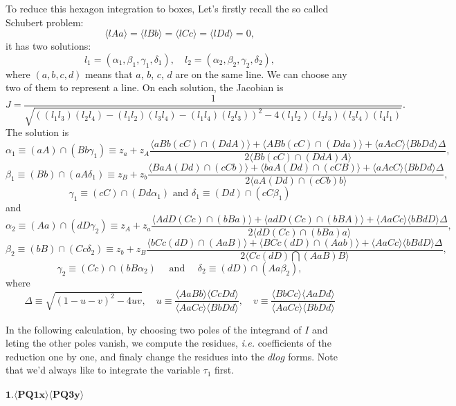\documentclass[10pt]{article}
\def\<{\langle}
\def\>{\rangle}
\begin{document}
To reduce this hexagon integration to boxes, Let's firstly recall the so called Schubert problem: 
\[
    \langle lAa\rangle = \langle lBb\rangle = \langle lCc\rangle = \langle lDd\rangle=0,
\]
it has two solutions:
\[
    l_1 = (\alpha_1,\beta_1,\gamma_1,\delta_1),\quad l_2 = (\alpha_2,\beta_2,\gamma_2,\delta_2),
\]
where $(a,b,c,d)$ means that $a$, $b$, $c$, $d$ are on the same line. We can choose any two of them to represent a line. On each solution, the Jacobian is 
\[
    J=\frac{1}{\sqrt{((l_1l_3)(l_2l_4)-(l_1l_2)(l_3l_4)-(l_1l_4)(l_2l_3))^2-4(l_1l_2)(l_2l_3)(l_3l_4)(l_4l_1)}}.
\]
The solution is
\[
    \alpha_{1} \equiv(a A) \cap\left(B b \gamma_{1}\right) \equiv z_{a}+z_{A} \frac{\langle a B b(c C) \cap(D d A)\rangle+\langle A B b(c C) \cap(D d a)\rangle+\langle a A c C\rangle\langle B b D d\rangle \Delta}{2\langle B b(c C) \cap(D d A) A\rangle},
\]
\[
    \beta_{1} \equiv(B b) \cap\left(a A \delta_{1}\right) \equiv z_{B}+z_{b} \frac{\langle B a A(D d) \cap(c C b)\rangle+\langle b a A(D d) \cap(c C B)\rangle+\langle a A c C\rangle\langle B b D d\rangle \Delta}{2\langle a A(D d) \cap(c C b) b\rangle},
\]
\[
    \gamma_{1} \equiv(c C) \cap\left(D d \alpha_{1}\right) \text { and } \delta_{1} \equiv(D d) \cap\left(c C \beta_{1}\right)
\]
and 
\[
    \alpha_{2} \equiv(A a) \cap\left(d D \gamma_{2}\right) \equiv z_{A}+z_{a} \frac{\langle A d D(C c) \cap(b B a)\rangle+\langle a d D(C c) \cap(b B A)\rangle+\langle A a C c\rangle\langle b B d D\rangle \Delta}{2\langle d D(C c) \cap(b B a) a\rangle},
\]
\[
    \beta_{2} \equiv(b B) \cap\left(C c \delta_{2}\right) \equiv z_{b}+z_{B} \frac{\langle b C c(d D) \cap(A a B)\rangle+\langle B C c(d D) \cap(A a b)\rangle+\langle A a C c\rangle\langle b B d D\rangle \Delta}{2\langle C c(d D) \bigcap(A a B) B\rangle},
\]
\[
    \gamma_{2} \equiv(C c) \cap\left(b B \alpha_{2}\right) \quad \text { and } \quad \delta_{2} \equiv(d D) \cap\left(A a \beta_{2}\right),
\]
where 
\[
    \Delta \equiv \sqrt{(1-u-v)^{2}-4 u v}, \quad u \equiv \frac{\<AaBb\>\<CcDd\>}{\<AaCc\>\<BbDd\>}, \quad v \equiv \frac{\<BbCc\>\<AaDd\>}{\<AaCc\>\<BbDd\>}
\]

In the following calculation, by  choosing two poles of the integrand of $I$ and leting the other poles vanish, we compute the residues, {\it i.e.} coefficients of the reduction one by one, and finaly change the residues into the $dlog$ forms. Note that we'd always like to integrate the variable $\tau_1$ first.

\paragraph{$\mathbf{1.\<PQ1x\>\<PQ3y\>}$}
\end{document}
